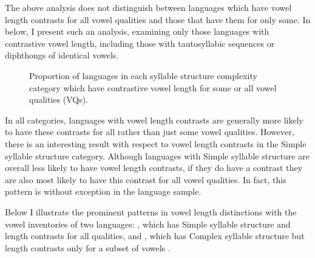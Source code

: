   The above analysis does not distinguish between languages which have vowel length contrasts for all vowel qualities and those that have them for only some. In  below, I present such an analysis, examining only those languages with contrastive vowel length, including those with tautosyllabic sequences or diphthongs of identical vowels.

\begin{figure}
\caption{\label{fig:4.2} Proportion of languages in each syllable structure complexity category which have contrastive vowel length for some or all vowel qualities (VQs).}
\end{figure}

  In all categories, languages with vowel length contrasts are generally more likely to have these contrasts for all rather than just some vowel qualities. However, there is an interesting result with respect to vowel length contrasts in the Simple syllable structure category. Although languages with Simple syllable structure are overall less likely to have vowel length contrasts, if they do have a contrast they are also most likely to have this contrast for all vowel qualities. In fact, this pattern is without exception in the language sample.

  Below I illustrate the prominent patterns in vowel length distinctions with the vowel inventories of two languages: , which has Simple syllable structure and length contrasts for all qualities, and , which has Complex syllable structure but length contrasts only for a subset of vowels .

